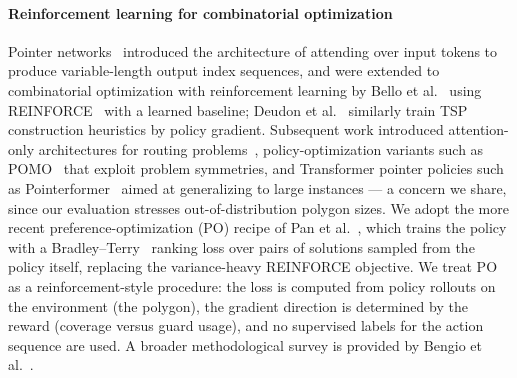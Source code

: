\documentclass[preprint,10pt]{elsarticle}
\begin{document}
\paragraph{Reinforcement learning for combinatorial optimization} Pointer networks~\cite{Vinyals2015} introduced the architecture of attending over input tokens to produce variable-length output index sequences, and were extended to combinatorial optimization with reinforcement learning by Bello et al.~\cite{Bello2016} using REINFORCE~\cite{Williams1992} with a learned baseline; Deudon et al.~\cite{Deudon2018TSP} similarly train TSP construction heuristics by policy gradient. Subsequent work introduced attention-only architectures for routing problems~\cite{Kool2019Attention}, policy-optimization variants such as POMO~\cite{Kwon2020POMO} that exploit problem symmetries, and Transformer pointer policies such as Pointerformer~\cite{Jin2023Pointerformer} aimed at generalizing to large instances --- a concern we share, since our evaluation stresses out-of-distribution polygon sizes. We adopt the more recent preference-optimization (PO) recipe of Pan et al.~\cite{Pan2025PO}, which trains the policy with a Bradley--Terry~\cite{BradleyTerry1952} ranking loss over pairs of solutions sampled from the policy itself, replacing the variance-heavy REINFORCE objective. We treat PO as a reinforcement-style procedure: the loss is computed from policy rollouts on the environment (the polygon), the gradient direction is determined by the reward (coverage versus guard usage), and no supervised labels for the action sequence are used. A broader methodological survey is provided by Bengio et al.~\cite{survey:BENGIO2021405}.
\end{document}
